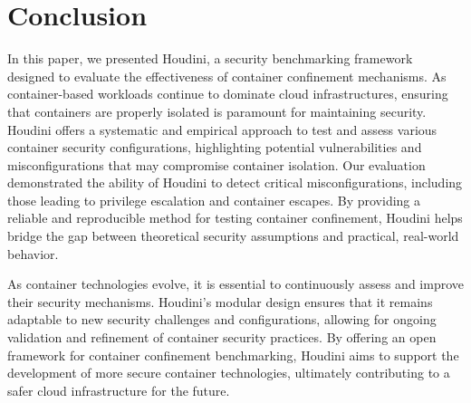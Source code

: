 \section{Conclusion}
\label{sec:conclusion}

In this paper, we presented Houdini, a security benchmarking framework designed to evaluate the effectiveness of container confinement mechanisms. As container-based workloads continue to dominate cloud infrastructures, ensuring that containers are properly isolated is paramount for maintaining security. Houdini offers a systematic and empirical approach to test and assess various container security configurations, highlighting potential vulnerabilities and misconfigurations that may compromise container isolation. Our evaluation demonstrated the ability of Houdini to detect critical misconfigurations, including those leading to privilege escalation and container escapes. By providing a reliable and reproducible method for testing container confinement, Houdini helps bridge the gap between theoretical security assumptions and practical, real-world behavior.

As container technologies evolve, it is essential to continuously assess and improve their security mechanisms. Houdini's modular design ensures that it remains adaptable to new security challenges and configurations, allowing for ongoing validation and refinement of container security practices. By offering an open framework for container confinement benchmarking, Houdini aims to support the development of more secure container technologies, ultimately contributing to a safer cloud infrastructure for the future.